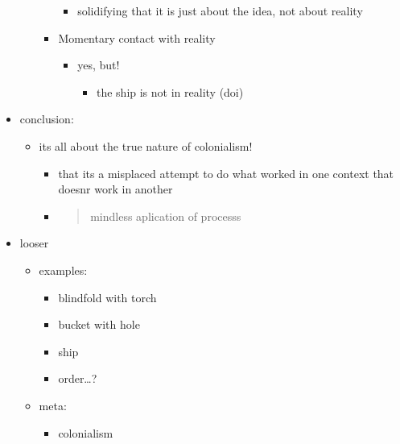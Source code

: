 \documentclass[letterpaper]{article}
\begin{document}
\begin{itemize}
\begin{itemize}
\begin{itemize}
\begin{itemize}
\item solidifying that it is just about the idea, not about reality
\end{itemize}

\item Momentary contact with reality

\begin{itemize}
\item yes, but!

\begin{itemize}
\item the ship is not in reality (doi)
\end{itemize}
\end{itemize}
\end{itemize}
\end{itemize}

\item conclusion:

\begin{itemize}
\item its all about the true nature of colonialism!

\begin{itemize}
\item that its a misplaced attempt to do what worked in one context that
doesnr work in another

\item \begin{quote}
mindless aplication of processs
\end{quote}
\end{itemize}
\end{itemize}

\item looser

\begin{itemize}
\item examples:

\begin{itemize}
\item blindfold with torch\\
\item bucket with hole
\item ship
\item order\ldots{}?
\end{itemize}

\item meta:

\begin{itemize}
\item colonialism
\end{itemize}
\end{itemize}
\end{itemize}
\end{document}
